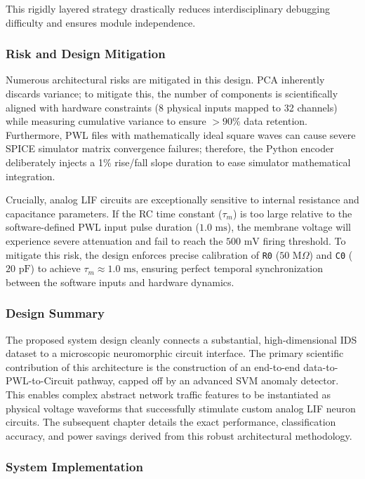 \documentclass{ieeeaccess}
\begin{document}
This rigidly layered strategy drastically reduces interdisciplinary debugging difficulty and ensures module independence.

\subsubsection{Risk and Design Mitigation}

Numerous architectural risks are mitigated in this design. PCA inherently discards variance; to mitigate this, the number of components is scientifically aligned with hardware constraints (8 physical inputs mapped to 32 channels) while measuring cumulative variance to ensure $>90\%$ data retention. Furthermore, PWL files with mathematically ideal square waves can cause severe SPICE simulator matrix convergence failures; therefore, the Python encoder deliberately injects a 1\% rise/fall slope duration to ease simulator mathematical integration. 

Crucially, analog LIF circuits are exceptionally sensitive to internal resistance and capacitance parameters. If the RC time constant ($\tau_m$) is too large relative to the software-defined PWL input pulse duration ($1.0\text{ ms}$), the membrane voltage will experience severe attenuation and fail to reach the $500\text{ mV}$ firing threshold. To mitigate this risk, the design enforces precise calibration of \texttt{R0} ($50\text{ M}\Omega$) and \texttt{C0} ($20\text{ pF}$) to achieve $\tau_m \approx 1.0\text{ ms}$, ensuring perfect temporal synchronization between the software inputs and hardware dynamics.

\subsubsection{Design Summary}

The proposed system design cleanly connects a substantial, high-dimensional IDS dataset to a microscopic neuromorphic circuit interface. The primary scientific contribution of this architecture is the construction of an end-to-end data-to-PWL-to-Circuit pathway, capped off by an advanced SVM anomaly detector. This enables complex abstract network traffic features to be instantiated as physical voltage waveforms that successfully stimulate custom analog LIF neuron circuits. The subsequent chapter details the exact performance, classification accuracy, and power savings derived from this robust architectural methodology.


\subsubsection{System Implementation}
\end{document}
